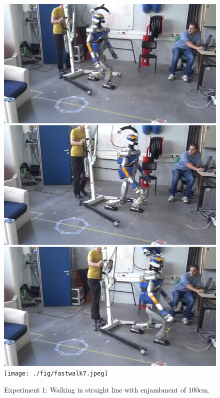 \begin{figure}[!ht]
\begin{center}
  \includegraphics[trim={7.0cm 0.0cm 20.0cm 0.0cm}, clip, width=0.2\widthValue]
    {./fig/fastwalk4.jpeg}
  \includegraphics[trim={18.0cm 0.0cm 10.0cm 0.0cm}, clip, width=0.2\widthValue]
    {./fig/fastwalk5.jpeg}
  \includegraphics[trim={23.0cm 0.0cm 5.0cm 0.0cm}, clip, width=0.2\widthValue]
    {./fig/fastwalk6.jpeg}
  \texttt{[image: ./fig/fastwalk7.jpeg]}
  \caption{
    Experiment 1: Walking in straight line with enjambment of $100$cm.
  }
  \label{fig:moviepicture}
  \end{center}
\end{figure}

